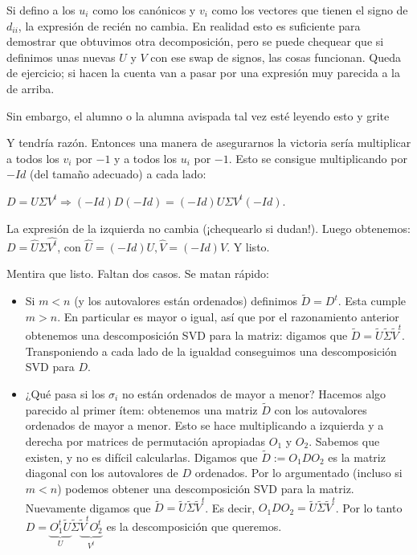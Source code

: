 \documentclass[10pt,a4paper,final]{article}
\begin{document}
Si defino a los $u_i$ como los canónicos y $v_i$ como los vectores que tienen el signo de $d_{ii}$, la expresión de recién no cambia. En realidad esto es suficiente para demostrar que obtuvimos otra decomposición, pero se puede chequear que si definimos unas nuevas $U$ y $V$ con ese swap de signos, las cosas funcionan. Queda de ejercicio; si hacen la cuenta van a pasar por una expresión muy parecida a la de arriba.

Sin embargo, el alumno o la alumna avispada tal vez esté leyendo esto y grite 

Y tendría razón. Entonces una manera de asegurarnos la victoria sería multiplicar a todos los $v_i$ por $-1$ y a todos los $u_i$ por $-1$. Esto se consigue multiplicando por $-Id$ (del tamaño adecuado) a cada lado:

$D = U\Sigma V^t \Rightarrow (-Id) D (-Id) = (-Id) U \Sigma V^t (-Id)$.

La expresión de la izquierda no cambia (¡chequearlo si dudan!). Luego obtenemos: $D = \hat{U} \Sigma \hat{V^t}$, con $\hat{U} = (-Id) U, \hat{V} = (-Id) V$. Y listo. \bigskip

Mentira que listo. Faltan dos casos. Se matan rápido:

\begin{itemize}
    \item Si $m <n$ (y los autovalores están ordenados) definimos $\tilde{D} = D^t$. Esta cumple $m> n$. En particular es mayor o igual, así que por el razonamiento anterior obtenemos una descomposición SVD para la matriz: digamos que  $\tilde{D} = \tilde{U} \tilde{\Sigma} \tilde{V}^t$. Transponiendo a cada lado de la igualdad conseguimos una descomposición SVD para $D$.
    \item ¿Qué pasa si los $\sigma_i$ no están ordenados de mayor a menor? Hacemos algo parecido al primer ítem: obtenemos una matriz $\tilde{D}$ con los autovalores ordenados de mayor a menor. Esto se hace multiplicando a izquierda y a derecha por matrices de permutación apropiadas $O_1$ y $O_2$. Sabemos que existen, y no es difícil calcularlas. Digamos que $\tilde{D} := O_1 D O_2$ es la matriz diagonal con los autovalores de $D$ ordenados. Por lo argumentado (incluso si $m<n$) podemos obtener una descomposición SVD para la matriz. Nuevamente digamos que  $\tilde{D} = \tilde{U} \tilde{\Sigma} \tilde{V}^t$. Es decir, $O_1 D O_2 = \tilde{U} \tilde{\Sigma} \tilde{V}^t$. Por lo tanto $D = \underbrace{O_1^t \tilde{U}}_{U} \tilde{\Sigma} \underbrace{\tilde{V}^t O_2^t}_{V^t}$ es la descomposición que queremos.
\end{itemize}
\end{document}

